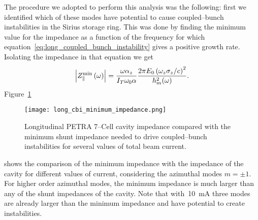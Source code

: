     The procedure we adopted to perform this analysis was the following: first we identified which of these modes have potential to cause coupled--bunch instabilities in the Sirius storage ring. This was done by finding the minimum value for the impedance as a function of the frequency for which equation~\eqref{eq:long_coupled_bunch_instability} gives a positive growth rate. Isolating the impedance in that equation we get
    \begin{align}\label{eq:long_cbi_minimum_impedance}
        \left|Z_\parallel^\text{min}\left(\omega\right)\right| = \frac{\omega\alpha_z}{I_T\omega_0\alpha}\frac{2\pi E_0\left(\omega_z\sigma_z/c\right)^2}{h_m^2(\omega)}.
    \end{align}
    Figure~\ref{fig:long_cbi_minimum_impedance}
    \begin{figure}
        \centering
        \texttt{[image: long\_cbi\_minimum\_impedance.png]}
        \caption{Longitudinal PETRA 7--Cell cavity impedance compared with the minimum shunt impedance needed to drive coupled--bunch instabilities for several values of  total beam current.}
        \label{fig:long_cbi_minimum_impedance}
    \end{figure}
    shows the comparison of the minimum impedance with the impedance of the cavity for different values of current, considering the azimuthal modes $m=\pm1$. For higher order azimuthal modes, the minimum impedance is much larger than any of the shunt impedances of the cavity. Note that with~\SI{10}{\milli\ampere} three modes are already larger than the minimum impedance and have potential to create instabilities.

